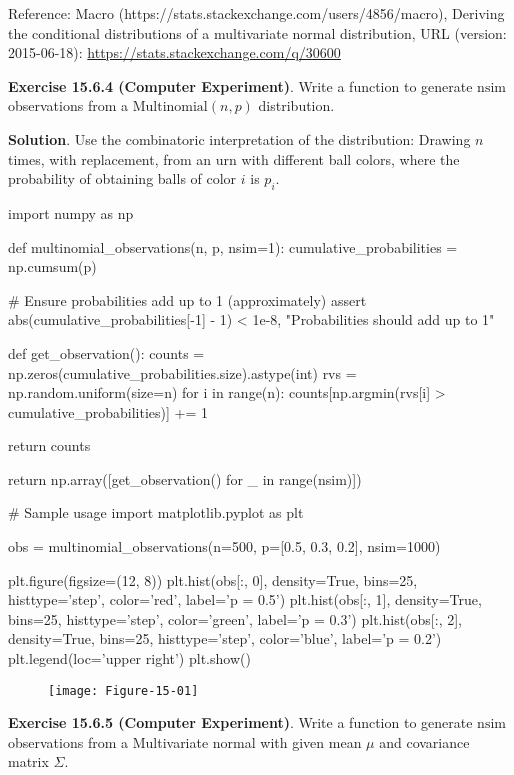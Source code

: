 Reference: Macro (https://stats.stackexchange.com/users/4856/macro),
Deriving the conditional distributions of a multivariate normal
distribution, URL (version: 2015-06-18):
\url{https://stats.stackexchange.com/q/30600}

\textbf{Exercise 15.6.4 (Computer Experiment)}. Write a function to
generate \(\text{nsim}\) observations from a
\(\text{Multinomial}(n, p)\) distribution.

\textbf{Solution}. Use the combinatoric interpretation of the
distribution: Drawing \(n\) times, with replacement, from an urn with
different ball colors, where the probability of obtaining balls of color
\(i\) is \(p_{i}\).

\begin{python}
import numpy as np

def multinomial_observations(n, p, nsim=1):
    cumulative_probabilities = np.cumsum(p)
    
    # Ensure probabilities add up to 1 (approximately)
    assert abs(cumulative_probabilities[-1] - 1) < 1e-8, "Probabilities should add up to 1"
    
    def get_observation():
        counts = np.zeros(cumulative_probabilities.size).astype(int)
        rvs = np.random.uniform(size=n)
        for i in range(n):
            counts[np.argmin(rvs[i] > cumulative_probabilities)] += 1

        return counts
    
    return np.array([get_observation() for _ in range(nsim)])
\end{python}

\begin{python}
# Sample usage
import matplotlib.pyplot as plt

obs = multinomial_observations(n=500, p=[0.5, 0.3, 0.2], nsim=1000)

plt.figure(figsize=(12, 8))
plt.hist(obs[:, 0], density=True, bins=25, histtype='step', color='red', label='p = 0.5')
plt.hist(obs[:, 1], density=True, bins=25, histtype='step', color='green', label='p = 0.3')
plt.hist(obs[:, 2], density=True, bins=25, histtype='step', color='blue', label='p = 0.2')
plt.legend(loc='upper right')
plt.show()
\end{python}


\begin{figure}[H]
\centering
\texttt{[image: Figure-15-01]}
\end{figure}

\textbf{Exercise 15.6.5 (Computer Experiment)}. Write a function to
generate \(\text{nsim}\) observations from a Multivariate normal with
given mean \(\mu\) and covariance matrix \(\Sigma\).

